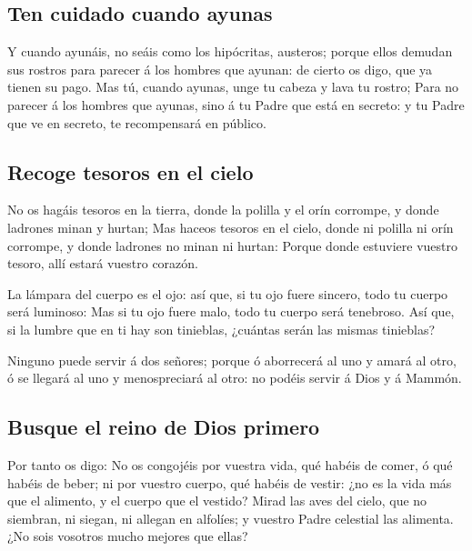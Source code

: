 \hypertarget{ten-cuidado-cuando-ayunas}{%
\subsection{Ten cuidado cuando ayunas}\label{ten-cuidado-cuando-ayunas}}

 Y cuando ayunáis, no seáis como los hipócritas,
austeros; porque ellos demudan sus rostros para parecer á los hombres
que ayunan: de cierto os digo, que ya tienen su pago. 
Mas tú, cuando ayunas, unge tu cabeza y lava tu rostro; 
Para no parecer á los hombres que ayunas, sino á tu Padre que está en
secreto: y tu Padre que ve en secreto, te recompensará en público.

\hypertarget{recoge-tesoros-en-el-cielo}{%
\subsection{Recoge tesoros en el
cielo}\label{recoge-tesoros-en-el-cielo}}

 No os hagáis tesoros en la tierra, donde la polilla y el
orín corrompe, y donde ladrones minan y hurtan;  Mas
haceos tesoros en el cielo, donde ni polilla ni orín corrompe, y donde
ladrones no minan ni hurtan:  Porque donde estuviere
vuestro tesoro, allí estará vuestro corazón.

 La lámpara del cuerpo es el ojo: así que, si tu ojo
fuere sincero, todo tu cuerpo será luminoso:  Mas si tu
ojo fuere malo, todo tu cuerpo será tenebroso. Así que, si la lumbre que
en ti hay son tinieblas, ¿cuántas serán las mismas tinieblas?

 Ninguno puede servir á dos señores; porque ó aborrecerá
al uno y amará al otro, ó se llegará al uno y menospreciará al otro: no
podéis servir á Dios y á Mammón.

\hypertarget{busque-el-reino-de-dios-primero}{%
\subsection{Busque el reino de Dios
primero}\label{busque-el-reino-de-dios-primero}}

 Por tanto os digo: No os congojéis por vuestra vida, qué
habéis de comer, ó qué habéis de beber; ni por vuestro cuerpo, qué
habéis de vestir: ¿no es la vida más que el alimento, y el cuerpo que el
vestido?  Mirad las aves del cielo, que no siembran, ni
siegan, ni allegan en alfolíes; y vuestro Padre celestial las alimenta.
¿No sois vosotros mucho mejores que ellas?

